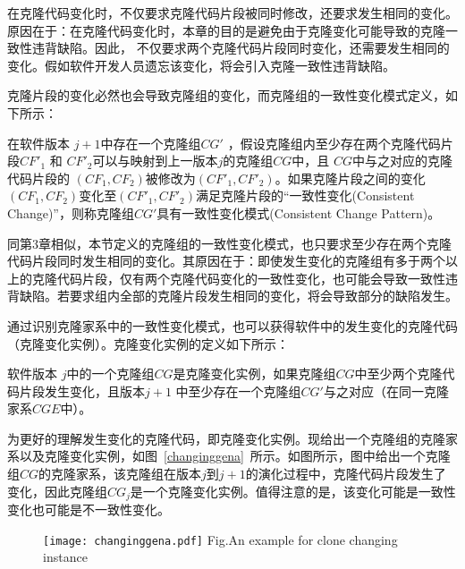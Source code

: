在克隆代码变化时，不仅要求克隆代码片段被同时修改，还要求发生相同的变化。原因在于：在克隆代码变化时，本章的目的是避免由于克隆变化可能导致的克隆一致性违背缺陷。因此， 不仅要求两个克隆代码片段同时变化，还需要发生相同的变化。假如软件开发人员遗忘该变化，将会引入克隆一致性违背缺陷。

克隆片段的变化必然也会导致克隆组的变化，而克隆组的一致性变化模式定义，如下所示：

\begin{definition}[克隆变化一致性模式] 
\label{def-changingpattern}
在软件版本 $j+1$中存在一个克隆组$CG'$ ，假设克隆组内至少存在两个克隆代码片段$CF'_1$ 和 $CF'_2$可以与映射到上一版本$j$的克隆组$CG$中，且 $CG$中与之对应的克隆代码片段的 $(CF_1,CF_2)$被修改为$(CF'_1,CF'_2)$。如果克隆片段之间的变化$(CF_1,CF_2)$变化至$(CF'_1,CF'_2)$满足克隆片段的“一致性变化(Consistent Change)”，则称克隆组$CG'$具有一致性变化模式(Consistent Change Pattern)。
\end{definition}

同第3章相似，本节定义的克隆组的一致性变化模式，也只要求至少存在两个克隆代码片段同时发生相同的变化。其原因在于：即使发生变化的克隆组有多于两个以上的克隆代码片段，仅有两个克隆代码变化的一致性变化，也可能会导致一致性违背缺陷。若要求组内全部的克隆片段发生相同的变化，将会导致部分的缺陷发生。

通过识别克隆家系中的一致性变化模式，也可以获得软件中的发生变化的克隆代码（克隆变化实例）。克隆变化实例的定义如下所示：

\begin{definition}[克隆变化实例] 
\label{def-changinginstance}
软件版本 $j$中的一个克隆组$CG$是克隆变化实例，如果克隆组$CG$中至少两个克隆代码片段发生变化，且版本$j+1$ 中至少存在一个克隆组$CG'$与之对应（在同一克隆家系$CGE$中）。 
\end{definition}

为更好的理解发生变化的克隆代码，即克隆变化实例。现给出一个克隆组的克隆家系以及克隆变化实例，如图~\ref{changinggena}~所示。如图所示，图中给出一个克隆组$CG$的克隆家系，该克隆组在版本$j$到$j+1$的演化过程中，克隆代码片段发生了变化，因此克隆组$CG_j$是一个克隆变化实例。值得注意的是，该变化可能是一致性变化也可能是不一致性变化。

\begin{figure}[htbp]
\centering
\texttt{[image: changinggena.pdf]}
{Fig.$\!$}{An example for clone changing instance}
\vspace{-1em}
\end{figure}

